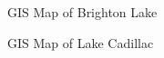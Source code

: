 



\begin{figure}[t]
\centerline{%
  }
\caption{GIS Map of Brighton Lake}
\end{figure}

\begin{figure}[t]
\centerline{%
  }
\caption{GIS Map of Lake Cadillac}
\end{figure}
